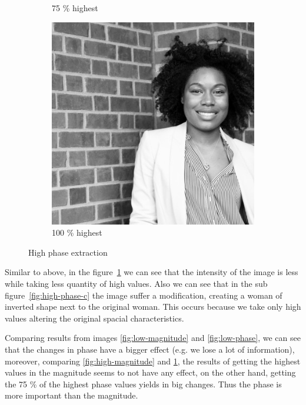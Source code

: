 \begin{figure}[h!]
\begin{subfigure}{0.2\textwidth}
  \caption{75 \% highest}
\end{subfigure}%
\begin{subfigure}{0.2\textwidth}
  \centering
  \includegraphics[width=0.95\linewidth]{output/phase_high_100.jpg}
  \caption{100 \% highest}
\end{subfigure}%
 \caption{High phase extraction}
\label{fig:high-phase}
\end{figure}
Similar to above, in the figure~\ref{fig:high-phase} we can see that the intensity of the image is less while taking less quantity of high values. Also we can see that in the sub figure~\ref{fig:high-phase-c} the image suffer a modification, creating a woman of inverted shape next to the original woman. This occurs because we take only high values altering the original spacial characteristics.

Comparing results from images \ref{fig:low-magnitude} and \ref{fig:low-phase}, we can see that the changes in phase have a bigger effect (e.g. we lose a lot of information), moreover, comparing \ref{fig:high-magnitude} and \ref{fig:high-phase}, the results of getting the highest values in the magnitude seems to not have any effect, on the other hand, getting the 75 \% of the highest phase values yields in big changes. Thus the phase is more important than the magnitude.

